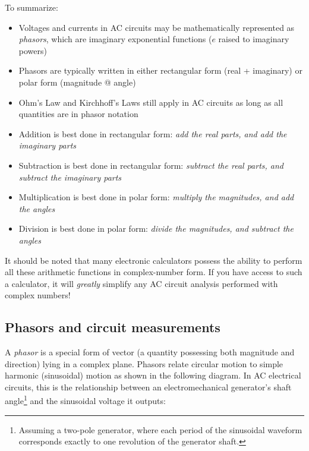\vskip 10pt

To summarize: 

\begin{itemize}
\item Voltages and currents in AC circuits may be mathematically represented as \textit{phasors}, which are imaginary exponential functions ($e$ raised to imaginary powers)
\item Phasors are typically written in either rectangular form (real + imaginary) or polar form (magnitude @ angle)
\item Ohm's Law and Kirchhoff's Laws still apply in AC circuits as long as all quantities are in phasor notation
\item Addition is best done in rectangular form: \textit{add the real parts, and add the imaginary parts}
\item Subtraction is best done in rectangular form: \textit{subtract the real parts, and subtract the imaginary parts}
\item Multiplication is best done in polar form: \textit{multiply the magnitudes, and add the angles}
\item Division is best done in polar form: \textit{divide the magnitudes, and subtract the angles}
\end{itemize}

It should be noted that many electronic calculators possess the ability to perform all these arithmetic functions in complex-number form.  If you have access to such a calculator, it will \textit{greatly} simplify any AC circuit analysis performed with complex numbers!









\filbreak
\subsection{Phasors and circuit measurements}

A \textit{phasor} is a special form of vector (a quantity possessing both magnitude and direction) lying in a complex plane.  Phasors relate circular motion to simple harmonic (sinusoidal) motion as shown in the following diagram.  In AC electrical circuits, this is the relationship between an electromechanical generator's shaft angle\footnote{Assuming a two-pole generator, where each period of the sinusoidal waveform corresponds exactly to one revolution of the generator shaft.} and the sinusoidal voltage it outputs:

